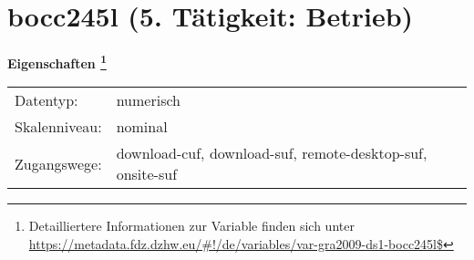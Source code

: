 
    \setcounter{footnote}{0}

    \vspace*{-1.8cm}
	\section{bocc245l (5. Tätigkeit: Betrieb)}
	\label{section:bocc245l}



    \vspace*{0.5cm}
    \noindent\textbf{Eigenschaften
	\footnote{Detailliertere Informationen zur Variable finden sich unter
		\url{https://metadata.fdz.dzhw.eu/\#!/de/variables/var-gra2009-ds1-bocc245l$}}}\\
	\begin{tabularx}{\hsize}{@{}lX}
	Datentyp: & numerisch \\
	Skalenniveau: & nominal \\
	Zugangswege: &
	  download-cuf, 
	  download-suf, 
	  remote-desktop-suf, 
	  onsite-suf
 \\
    \end{tabularx}



